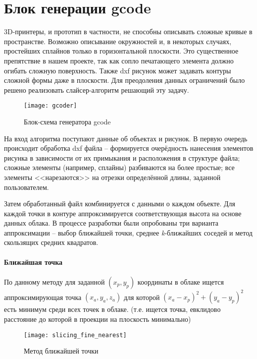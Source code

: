     \section{Блок генерации gcode}
        3D-принтеры, и прототип в частности, не способны описывать сложные кривые в пространстве. Возможно описывание окружностей и, в некоторых случаях, простейших сплайнов только в горизонтальной плоскости. Это существенное препятствие в нашем проекте, так как сопло печатающего элемента должно огибать сложную поверхность. Также dxf рисунок может задавать контуры сложной формы даже в плоскости. Для преодоления данных ограничений было решено реализовать слайсер-алгоритм решающий эту задачу.
        
        \begin{figure}[H]
            \centering
            \texttt{[image: gcoder]}
            \caption{Блок-схема генератора gcode}
            \label{pic:gcoder}
        \end{figure}
        
         На вход алгоритма поступают данные об объектах и рисунок. В первую очередь происходит обработка dxf файла -- формируется очерёдность нанесения элементов рисунка в зависимости от их примыкания и расположения в структуре файла; сложные элементы (например, сплайны) разбиваются на более простые; все элементы <<нарезаются>> на отрезки определённой длины, заданной пользователем.
         
         Затем обработанный файл комбинируется с данными о каждом объекте. Для каждой точки в контуре аппроксимируется соответствующая высота на основе данных облака. В процессе разработки были опробованы три варианта аппроксимации -- выбор ближайшей точки, среднее \textit{k}-ближайших соседей и метод скользящих средних квадратов.
         
         \paragraph{Ближайшая точка}
         По данному методу для заданной $ (x_p,y_p) $ координаты в облаке ищется аппроксимирующая точка $ (x_a, y_a, z_a) $ для которой $ (x_a-x_p)^2 + (y_a-y_p)^2 $ есть минимум среди всех точек в облаке. (т.е. ищется точка, евклидово расстояние до которой в проекции на плоскость минимально) 
         
         \begin{figure}[H]
             \centering
             \texttt{[image: slicing\_fine\_nearest]}
             \caption{Метод ближайшей точки}
              \label{pic:slicing_nearest}
         \end{figure}
         
